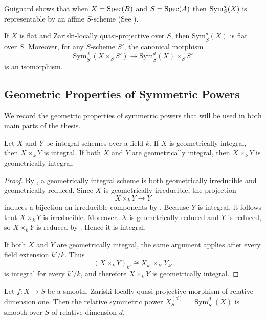 Guignard shows that when $X=\operatorname{Spec}(B)$ and $S=\operatorname{Spec}(A)$ then $\operatorname{Sym}_{S}^d(X)$ is representable by an affine $S$-scheme (See \cite[Remark~2.28]{Guignard2018}).

\begin{prop}\label{prop:symmetric_power_flat_base_change}
If $X$ is flat and Zariski-locally quasi-projective over $S$, then $\text{Sym}_S^d(X)$ is flat over $S$. Moreover, for any $S$-scheme $S'$, the canonical morphism
\[
\text{Sym}_{S'}^d(X \times_S S') \to \text{Sym}_S^d(X) \times_S S'
\]
is an isomorphism.
\end{prop}

\subsection*{Geometric Properties of Symmetric Powers}

We record the geometric properties of symmetric powers that will be used in
both main parts of the thesis.

\begin{theorem}\label{theorem:int_geoint_implies_productint}
Let $X$ and $Y$ be integral schemes over a field $k$. If $X$ is geometrically
integral, then $X \times_k Y$ is integral. If both $X$ and $Y$ are
geometrically integral, then $X \times_k Y$ is geometrically integral.
\end{theorem}
\begin{proof}
By , a geometrically integral scheme is both geometrically
irreducible and geometrically reduced. Since $X$ is geometrically irreducible,
the projection
\[
X\times_k Y\longrightarrow Y
\]
induces a bijection on irreducible components by .
Because $Y$ is integral, it follows that $X\times_k Y$ is irreducible.
Moreover, $X$ is geometrically reduced and $Y$ is reduced, so
$X\times_k Y$ is reduced by . Hence it is integral.

If both $X$ and $Y$ are geometrically integral, the same argument applies
after every field extension $k'/k$. Thus
\[
(X\times_kY)_{k'}\cong X_{k'}\times_{k'}Y_{k'}
\]
is integral for every $k'/k$, and therefore $X\times_kY$ is geometrically
integral.
\end{proof}

\begin{prop}\label{prop:relative_symmetric_power_smooth}
Let $f:X\to S$ be a smooth, Zariski-locally quasi-projective morphism of
relative dimension one. Then the relative symmetric power
$X_S^{(d)}=\operatorname{Sym}_S^d(X)$ is smooth over $S$ of relative dimension
$d$.
\end{prop}

